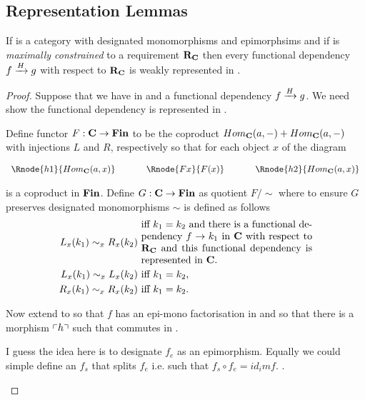 \documentclass[12pt,a4paper]{article}
\theoremstyle{remark}
\begin{document}
\subsection{Representation Lemmas}

\begin{lemma}
If \catcw is a category with designated monomorphisms and epimorphsims  and if \catcw is
\textit{maximally constrained} to a requirement $\reqtc$ then every functional dependency
 $\fundep{H}{f}{g}$ with respect to $\reqtc$ is weakly represented in \catcw.
\end{lemma}
\begin{proof}
Suppose that we have \fgsourcediagram in \catcw and a functional dependency
$\fundep{H}{f}{g}$. We need show the functional dependency is represented in \catc.

Define functor $F: \catc \morph \Fin$ 
to be the coproduct $Hom_{\catc}(a,-) + Hom_{\catc}(a,-)$
with injections $L$ and $R$, respectively so that
for each object $x$ of \catcw the diagram
\begin{center}
$
\begin{array}{c p{0.5cm} c p{0.5cm} c  }
\Rnode{h1}{Hom_{\catc}(a,x)}  &&\Rnode{Fx}{F(x)}  &&   \Rnode{h2}{Hom_{\catc}(a,x)}       
\end{array} 
$
\end{center}
is a coproduct in $\Fin$.
\medskip
Define $G: \catc \morph \Fin$ as quotient $F/\sim$ where 
to ensure $G$ preserves designated monomorphisms  $\sim$ is defined as follows
\begin{align*}
L_x(k_1) \sim_x R_x(k_2) & \mbox{ \parbox{6cm}{iff  $k_1=k_2$ and there is a functional dependency 
$f \morph k_1$ in \catcw with respect to $\reqtc$ and  this functional dependency is represented in \catc.}}\\
L_x(k_1) \sim_x L_x(k_2) & \mbox{ iff $k_1 = k_2$,} \\
R_x(k_1) \sim_x R_x(k_2) & \mbox{ iff $k_1 = k_2$.} \\
\end{align*}

Now extend \catcw to \catcpw so that $f$ has an epi-mono factorisation in \catcpw
and so that there  is a morphism $\qq{h}$ such that
commutes in \catcp. \\
\begin{newtt}I guess the idea here is to designate $f_e$ as an epimorphism. Equally we could simple define an $f_s$ that splits $f_e$ i.e. such that $f_s \circ f_e = id_im{f}$.
.


\end{newtt}
\end{proof}
\end{document}
